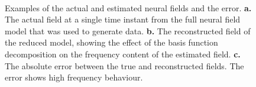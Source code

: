 \documentclass[10pt,a4paper]{article}
\begin{document}
\begin{figure}
\centering 
{}
\\
\caption{Examples of the actual and estimated neural fields and the error. \textbf{a.} The actual field at a single time instant from the full neural field model that was used to generate data. \textbf{b.} The reconstructed field of the reduced model, showing the effect of the basis function decomposition on the frequency content of the estimated field. \textbf{c.} The absolute error between the true and reconstructed fields. The error shows high frequency behaviour.}
\label{fig:FieldEstimate}
\end{figure}
\end{document}
